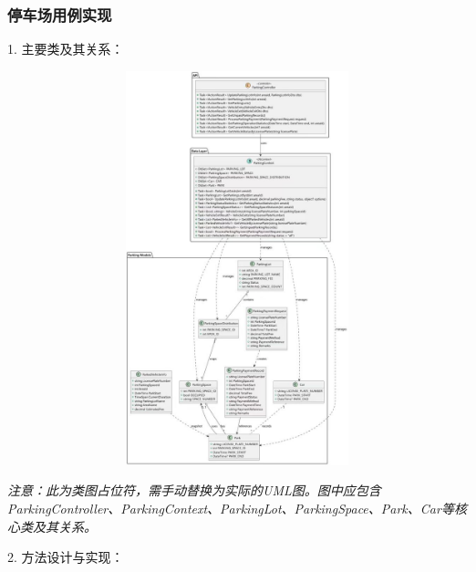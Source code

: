\documentclass[]{article}
\let\oldincludegraphics\includegraphics
\renewcommand{\includegraphics}[2][]{%
  \begin{center}\oldincludegraphics[#1]{#2}\end{center}%
}
\begin{document}
\hypertarget{ux505cux8f66ux573aux7528ux4f8bux5b9eux73b0}{%
\subsubsection{停车场用例实现}\label{ux505cux8f66ux573aux7528ux4f8bux5b9eux73b0}}

1. 主要类及其关系：

\includegraphics[width=6.2in,height=4.5in]{media/2.8/uml.jpg} %
\textit{注意：此为类图占位符，需手动替换为实际的UML图。图中应包含ParkingController、ParkingContext、ParkingLot、ParkingSpace、Park、Car等核心类及其关系。}

2. 方法设计与实现：
\end{document}
